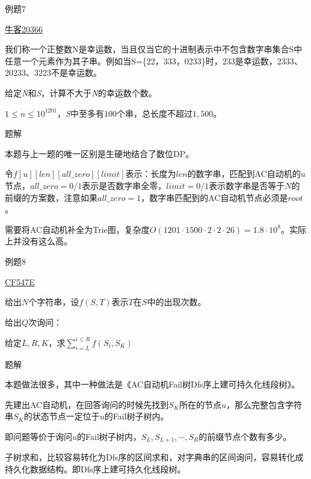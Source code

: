 \documentclass{ctexbeamer}		%
\begin{document}
\begin{frame}{例题7}

\begin{block}{\href{https://ac.nowcoder.com/acm/problem/20366}{牛客20366}}

我们称一个正整数N是幸运数，当且仅当它的十进制表示中不包含数字串集合S中任意一个元素作为其子串。例如当S=\{22，333，0233\}时，233是幸运数，2333、20233、3223不是幸运数。     

给定\textit{N}和\textit{S}，计算不大于\textit{N}的幸运数个数。

$1 \leq n \leq 10^{1201}$，\textit{S}中至多有$100$个串，总长度不超过$1,500$。

\end{block}

\pause

\begin{block}{题解}

本题与上一题的唯一区别是生硬地结合了数位DP。

令$f[u][len][all\_zero][limit]$表示：长度为$len$的数字串，匹配到AC自动机的$u$节点，$all\_zero = 0/1$表示是否数字串全零，$limit = 0/1$表示数字串是否等于$N$的前缀的方案数，注意如果$all\_zero = 1$，数字串匹配到的AC自动机节点必须是$root$。

需要将AC自动机补全为Trie图，复杂度$O(1201 \cdot 1500 \cdot 2 \cdot 2 \cdot 26) = 1.8 \cdot 10^8$。实际上并没有这么高。

\end{block}


\end{frame}

\begin{frame}{例题8}
    
\begin{block}{\href{http://codeforces.com/contest/547/problem/E}{CF547E}}

给出$N$个字符串，设$f(S,T)$表示$T$在$S$中的出现次数。

给出$Q$次询问：

给定$L,R,K$，求$\sum_{i = L}^{i \leq R}{f(S_i,S_K)}$

\end{block}

\pause

\begin{block}{题解}

本题做法很多，其中一种做法是《AC自动机Fail树Dfs序上建可持久化线段树》。

\pause

先建出AC自动机，在回答询问的时候先找到$S_K$所在的节点$u$，那么完整包含字符串$S_K$的状态节点一定位于$u$的Fail树子树内。

\pause

即问题等价于询问$u$的Fail树子树内，$S_L, S_{L+1}, \cdots, S_R$的前缀节点个数有多少。

\pause

子树求和，比较容易转化为Dfs序的区间求和，对字典串的区间询问，容易转化成持久化数据结构。即Dfs序上建可持久化线段树。

\end{block}

\end{frame}
\end{document}
